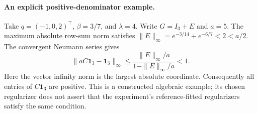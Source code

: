 \paragraph{An explicit positive-denominator example.}
Take $q=(-1,0,2)^\top$, $\beta=3/7$, and $\lambda=4$. Write $G=I_3+E$ and $a=5$. The maximum absolute row-sum norm satisfies $\|E\|_\infty=e^{-3/14}+e^{-6/7}<2<a/2$. The convergent Neumann series gives
\[
 \|aC\mathbf1_3-\mathbf1_3\|_\infty
 \leq\frac{\|E\|_\infty/a}{1-\|E\|_\infty/a}<1.
\]
Here the vector infinity norm is the largest absolute coordinate. Consequently all entries of $C\mathbf1_3$ are positive. This is a constructed algebraic example; its chosen regularizer does not assert that the experiment's reference-fitted regularizers satisfy the same condition.
